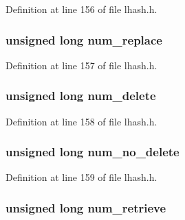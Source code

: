 Definition at line 156 of file lhash.\+h.

\subsubsection[{\texorpdfstring{num\+\_\+replace}{num_replace}}]{\setlength{\rightskip}{0pt plus 5cm}unsigned long num\+\_\+replace}\hypertarget{structlhash__st_a2757120aebd9f9bbeda735299cb29b0c}{}\label{structlhash__st_a2757120aebd9f9bbeda735299cb29b0c}


Definition at line 157 of file lhash.\+h.

\subsubsection[{\texorpdfstring{num\+\_\+delete}{num_delete}}]{\setlength{\rightskip}{0pt plus 5cm}unsigned long num\+\_\+delete}\hypertarget{structlhash__st_ae4bf11cd35dfa4c2c09c096d682d7ca2}{}\label{structlhash__st_ae4bf11cd35dfa4c2c09c096d682d7ca2}


Definition at line 158 of file lhash.\+h.

\subsubsection[{\texorpdfstring{num\+\_\+no\+\_\+delete}{num_no_delete}}]{\setlength{\rightskip}{0pt plus 5cm}unsigned long num\+\_\+no\+\_\+delete}\hypertarget{structlhash__st_af664b1b0e185aed79d66dc35cb134634}{}\label{structlhash__st_af664b1b0e185aed79d66dc35cb134634}


Definition at line 159 of file lhash.\+h.

\subsubsection[{\texorpdfstring{num\+\_\+retrieve}{num_retrieve}}]{\setlength{\rightskip}{0pt plus 5cm}unsigned long num\+\_\+retrieve}\hypertarget{structlhash__st_adcc130ea97d4686b901c4fa01f7eac1a}{}\label{structlhash__st_adcc130ea97d4686b901c4fa01f7eac1a}


